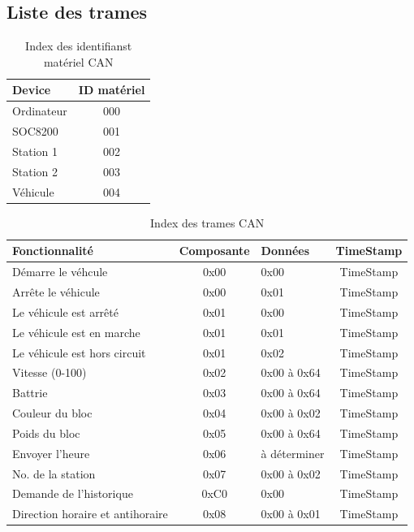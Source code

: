 \documentclass[10pt,a4paper,final]{article}
\begin{document}
\begin{spacing}{1.5}
\pagebreak
\subsection{Liste des trames}

\begin{table}[!ht]
\caption{Index des identifianst matériel CAN}
\medskip
\centering
\begin{tabular}{|l|c|}
\hline 
\textbf{Device} & \textbf{ID matériel} \\ 
\hline 
Ordinateur & 000 \\ 
\hline 
SOC8200 & 001 \\ 
\hline 
Station 1 & 002 \\ 
\hline 
Station 2  & 003 \\ 
\hline 
Véhicule  & 004 \\ 
\hline 
\end{tabular} 
\label{tab:testtab1}
\end{table} 


\begin{table}[!ht]
\caption{Index des trames CAN}
\medskip
\centering
\begin{tabular}{|l|c|l|c|}
\hline 
\textbf{Fonctionnalité} & \textbf{Composante} & \textbf{Données} & \textbf{TimeStamp}\\
\hline 
Démarre le véhcule & 0x00 & 0x00 & TimeStamp\\ 
\hline 
Arrête le véhicule & 0x00 & 0x01 & TimeStamp\\ 
\hline 
Le véhicule est arrêté & 0x01 & 0x00 & TimeStamp\\ 
\hline 
Le véhicule est en marche& 0x01 & 0x01 & TimeStamp\\ 
\hline 
Le véhicule est hors circuit & 0x01 & 0x02 & TimeStamp\\ 
\hline 
Vitesse (0-100) & 0x02 & 0x00 à 0x64 & TimeStamp\\ 
\hline 
Battrie & 0x03 & 0x00 à 0x64 & TimeStamp\\ 
\hline 
Couleur du bloc & 0x04 & 0x00 à 0x02 & TimeStamp\\ 
\hline 
Poids du bloc & 0x05 & 0x00 à 0x64 & TimeStamp\\ 
\hline 
Envoyer l'heure & 0x06 & à déterminer  & TimeStamp\\ 
\hline 
No. de la station & 0x07 & 0x00 à 0x02 & TimeStamp\\ 
\hline 
Demande de l'historique & 0xC0 & 0x00 & TimeStamp\\ 
\hline 
Direction horaire et antihoraire & 0x08 & 0x00 à 0x01 & TimeStamp\\
\hline
\end{tabular} 
\label{tab:testtab1}
\end{table}


\end{spacing}
\end{document}
